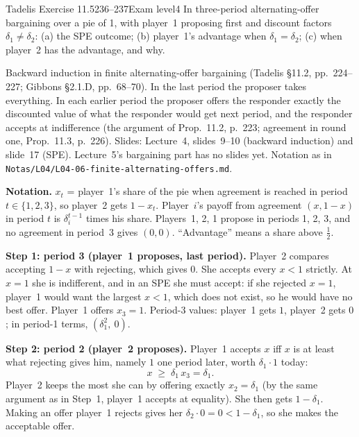 \begin{exsol}{Tadelis Exercise 11.5}{236--237}{Exam level}{4}
\asked In three-period alternating-offer bargaining over a pie of 1, with player~1 proposing first
and discount factors $\delta_1 \ne \delta_2$: (a) the SPE outcome; (b) player~1's advantage when
$\delta_1 = \delta_2$; (c) when player~2 has the advantage, and why.

\method Backward induction in finite alternating-offer bargaining (Tadelis \S11.2, pp.~224--227;
Gibbons \S2.1.D, pp.~68--70). In the last period the proposer takes everything. In each earlier
period the proposer offers the responder exactly the discounted value of what the responder would
get next period, and the responder accepts at indifference (the argument of Prop.~11.2, p.~223;
agreement in round one, Prop.~11.3, p.~226). Slides: Lecture~4, slides~9--10 (backward induction)
and slide~17 (SPE). Lecture~5's bargaining part has no slides yet. Notation as in
\texttt{Notas/L04/L04-06-finite-alternating-offers.md}.

\solution
\textbf{Notation.} $x_t$ = player~1's share of the pie when agreement is reached in period
$t \in \{1,2,3\}$, so player~2 gets $1 - x_t$. Player~$i$'s payoff from agreement $(x, 1-x)$ in
period $t$ is $\delta_i^{t-1}$ times his share. Players~1, 2, 1 propose in periods 1, 2, 3, and no
agreement in period~3 gives $(0,0)$. ``Advantage'' means a share above $\frac12$.

\textbf{Step 1: period 3 (player~1 proposes, last period).} Player~2 compares accepting $1-x$ with
rejecting, which gives $0$. She accepts every $x < 1$ strictly. At $x = 1$ she is indifferent, and
in an SPE she must accept: if she rejected $x = 1$, player~1 would want the largest $x < 1$, which
does not exist, so he would have no best offer. Player~1 offers $x_3 = 1$. Period-3 values:
player~1 gets $1$, player~2 gets $0$; in period-1 terms, $(\delta_1^2,\ 0)$.

\textbf{Step 2: period 2 (player~2 proposes).} Player~1 accepts $x$ iff $x$ is at least what
rejecting gives him, namely $1$ one period later, worth $\delta_1 \cdot 1$ today:
\begin{equation}
  x \;\ge\; \delta_1\, x_3 = \delta_1 . \label{eq:tadelis-11-5-x2}
\end{equation}
Player~2 keeps the most she can by offering exactly $x_2 = \delta_1$ (by the same argument as in
Step~1, player~1 accepts at equality). She then gets $1 - \delta_1$. Making an offer player~1 rejects
gives her $\delta_2 \cdot 0 = 0 < 1 - \delta_1$, so she makes the acceptable offer.


\end{exsol}
